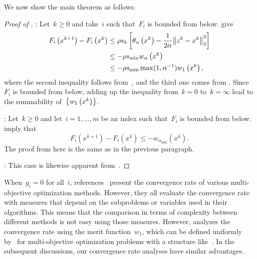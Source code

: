 \documentclass[../../main]{subfiles}
\begin{document}
We now show the main theorem as follows:
\begin{proof}[Proof of ]
    :
    Let~$k \ge 0$ and take~$i$ such that~$F_i$ is bounded from below.
     give
    \begin{align}
        F_i\left(x^{k + 1}\right) - F_i\left(x^k\right) & \le \rho s_k \left[ \theta_\alpha\left(x^k\right) - \frac{1}{2 \alpha} \norm*{z^k - x^k}_2^2 \right] \\
                                                        & \le - \rho s_{\min} w_\alpha\left(x^k\right)                                                         \\
                                                        & \le - \rho s_{\min} \max ( 1, \alpha^{-1} ) w_1\left(x^k\right)
        ,\end{align}
    where the second inequality follows from~, and the third one comes from .
    Since~$F_i$ is bounded from below, adding up the inequality from~$k = 0$ to~$k = \infty$ lead to the summability of~$\set*{w_1\left(x^k\right)}$.

    :
    Let~$k \ge 0$ and let~$i = 1, \dots, m$ be an index such that~$F_i$ is bounded from below.
     imply that
    \begin{equation}
        F_i\left(x^{k + 1}\right) - F_i\left(x^k\right) \le - w_{\alpha_{\min}}\left(x^k\right)
        .\end{equation}
    The proof from here is the same as in the previous paragraph.

    :
    This case is likewise apparent from~.
\end{proof}
\begin{remark}
    When~$g_i = 0$ for all~$i$, references~\cite{Calderon2020,Fliege2019,Grapiglia2015} present the convergence rate of various multi-objective optimization methods.
    However, they all evaluate the convergence rate with measures that depend on the subproblems or variables used in their algorithms.
    This means that the comparison in terms of complexity between different methods is not easy using those measures.
    However,  analyzes the convergence rate using the merit function~$w_1$, which can be defined uniformly by~ for multi-objective optimization problems with a structure like~.
    In the subsequent discussions, our convergence rate analyses have similar advantages.
\end{remark}
\end{document}
